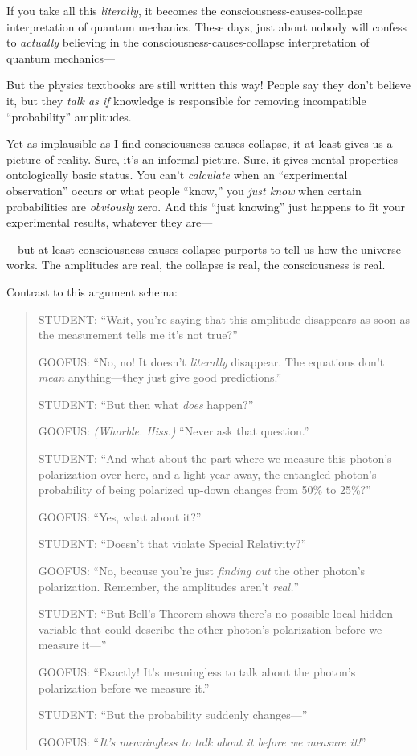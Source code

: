 {
 If you take all this \textit{literally}, it becomes the
consciousness-causes-collapse interpretation of quantum mechanics.
These days, just about nobody will confess to \textit{actually}
believing in the consciousness-causes-collapse interpretation of
quantum mechanics---}

{
 But the physics textbooks are still written this way! People say
they don't believe it, but they \textit{talk as if}
knowledge is responsible for removing incompatible
``probability'' amplitudes.}

{
 Yet as implausible as I find consciousness-causes-collapse, it at
least gives us a picture of reality. Sure, it's an
informal picture. Sure, it gives mental properties ontologically basic
status. You can't \textit{calculate} when an
``experimental observation'' occurs
or what people ``know,'' you
\textit{just know} when certain probabilities are \textit{obviously}
zero. And this ``just knowing'' just
happens to fit your experimental results, whatever they are---}

{
 {}---but at least consciousness-causes-collapse purports to tell
us how the universe works. The amplitudes are real, the collapse is
real, the consciousness is real.}

{
 Contrast to this argument schema:}

\begin{quotation}
{
 STUDENT: ``Wait, you're saying
that this amplitude disappears as soon as the measurement tells me
it's not true?''}

{
 GOOFUS: ``No, no! It doesn't
\textit{literally} disappear. The equations don't
\textit{mean} anything---they just give good
predictions.''}

{
 STUDENT: ``But then what \textit{does}
happen?''}

{
 GOOFUS: \textit{(Whorble. Hiss.)} ``Never ask
that question.''}

{
 STUDENT: ``And what about the part where we
measure this photon's polarization over here, and a
light-year away, the entangled photon's probability of
being polarized up-down changes from 50\% to 25\%?''}

{
 GOOFUS: ``Yes, what about
it?''}

{
 STUDENT: ``Doesn't that violate
Special Relativity?''}

{
 GOOFUS: ``No, because you're just
\textit{finding out} the other photon's polarization.
Remember, the amplitudes aren't
\textit{real.}''}

{
 STUDENT: ``But Bell's Theorem
shows there's no possible local hidden variable that
could describe the other photon's polarization before
we measure it---''}

{
 GOOFUS: ``Exactly! It's
meaningless to talk about the photon's polarization
before we measure it.''}

{
 STUDENT: ``But the probability suddenly
changes---''}

{
 GOOFUS: ``\textit{It's
meaningless to talk about it before we measure
it!}''}
\end{quotation}

